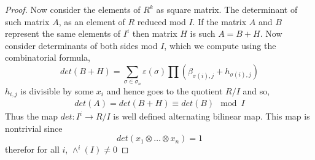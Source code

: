 \documentclass[11pt]{article}
\renewcommand{\epsilon}{\varepsilon}
\begin{document}
\begin{itemize}
\begin{proof}
        Now consider the elements of $R^{k}$ as square matrix. The determinant of such matrix $A$, as an element of $R$ reduced mod $I$. If the matrix $A$ and $B$ represent the same elements of $I^{i}$ then matrix $H$ is such $A = B + H$. Now consider determinants of both sides mod $I$, which we compute using the combinatorial formula,
        \[det(B+H) = \sum_{\sigma \in \sigma_n}\epsilon(\sigma)\prod(\beta_{\sigma(i),j} + h_{\sigma(i),j})\]
        $h_{i,j}$ is divisible by some $x_i$ and hence goes to the quotient $R/I$ and so,
        \begin{align*}
            det(A) = det(B+H) \equiv det(B)\mod I
        \end{align*}
        Thus the map $det:I^{i} \to R/I$ is well defined alternating bilinear map. This map is nontrivial since \[det(x_1\otimes \dots \otimes x_n) = 1\]
        therefor for all $i$, $\wedge^{i}(I) \neq 0 $
    \end{proof} 
\end{itemize}

\vspace*{15pt}
\end{document}
